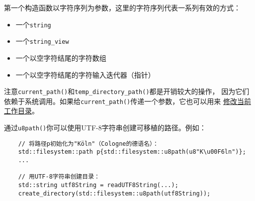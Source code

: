 第一个构造函数以字符序列为参数，这里的字符序列代表一系列有效的方式：
\begin{itemize}
    \item 一个\texttt{string}
    \item 一个\texttt{string\_view}
    \item 一个以空字符结尾的字符数组
    \item 一个以空字符结尾的字符输入迭代器（指针）
\end{itemize}
注意\texttt{current\_path()}和\texttt{temp\_directory\_path()}都是开销较大的操作，
因为它们依赖于系统调用。如果给\texttt{current\_path()}传递一个参数，它也可以用来
\hyperref[ch20.4.6]{修改当前工作目录}。

通过\texttt{u8path()}你可以使用UTF-8字符串创建可移植的路径。例如：
\begin{lstlisting}
    // 将路径p初始化为"Köln"（Cologne的德语名）：
    std::filesystem::path p{std::filesystem::u8path(u8"K\u00F6ln")};
    ...

    // 用UTF-8字符串创建目录：
    std::string utf8String = readUTF8String(...);
    create_directory(std::filesystem::u8path(utf8String));
\end{lstlisting}

